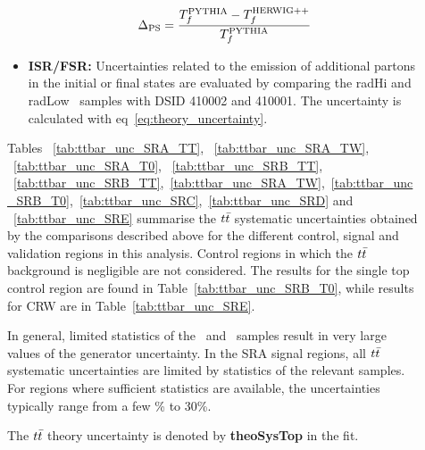 \begin{description}
\begin{itemize}
    \begin{eqnarray}
      \Delta_{\mathrm{PS}} = \frac{T_f^{\mathrm{PYTHIA}} - T_f^{\mathrm{HERWIG++}}}{T_f^{\mathrm{PYTHIA}}}
      \label{eq:ttbar_frag_uncertainty}
    \end{eqnarray}

  \item{\bf ISR/FSR:} Uncertainties related to the emission of additional partons in the initial or final states are evaluated by comparing the radHi and radLow \powheg\pythia\ samples with DSID 410002 and 410001. The uncertainty is calculated with eq~\ref{eq:theory_uncertainty}.

  \end{itemize}

  Tables ~\ref{tab:ttbar_unc_SRA_TT}, ~\ref{tab:ttbar_unc_SRA_TW}, ~\ref{tab:ttbar_unc_SRA_T0},  ~\ref{tab:ttbar_unc_SRB_TT},
~\ref{tab:ttbar_unc_SRB_TT},~\ref{tab:ttbar_unc_SRA_TW},~\ref{tab:ttbar_unc_SRB_T0},~\ref{tab:ttbar_unc_SRC},~\ref{tab:ttbar_unc_SRD}
and ~\ref{tab:ttbar_unc_SRE} summarise the $t\bar{t}$ systematic uncertainties obtained by the comparisons described above for the different
control, signal and validation regions in this analysis. Control regions in which the $t\bar{t}$ background is negligible are not considered. 
The results for the single top control region are found in Table~\ref{tab:ttbar_unc_SRB_T0}, while results for CRW are in
 Table~\ref{tab:ttbar_unc_SRE}.

 In general, limited statistics of the \mcatnlo\pythia\ and \sherpa\ samples result in very large values of the generator uncertainty. 
In the SRA signal regions, all $t\bar{t}$ systematic uncertainties are limited by statistics of the relevant samples. For regions where
sufficient statistics are available, the uncertainties typically range from a few \% to 30\%.

  The $t\bar{t}$ theory uncertainty is denoted by {\bf theoSysTop} in the fit.  
  

\end{description}
